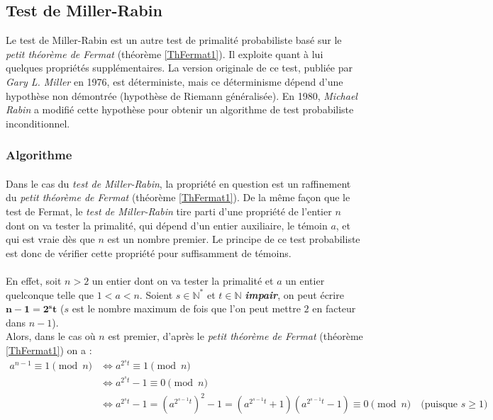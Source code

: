 \subsection{Test de Miller-Rabin}
	Le test de Miller-Rabin est un autre test de primalité probabiliste basé sur le \textit{petit théorème de Fermat} (théorème \ref{ThFermat1}). Il exploite quant à lui quelques propriétés supplémentaires. La version originale de ce test, publiée par \textit{Gary L. Miller} en 1976, est déterministe, mais ce déterminisme dépend d'une hypothèse non démontrée (hypothèse de Riemann généralisée). En 1980, \textit{Michael Rabin} a modifié cette hypothèse pour obtenir un algorithme de test probabiliste inconditionnel.
	
	\subsubsection{Algorithme}
		
		\paragraph{} Dans le cas du \textit{test de Miller-Rabin}, la propriété en question est un raffinement du \textit{petit théorème de Fermat} (théorème \ref{ThFermat1}). De la même façon que le test de Fermat, le \textit{test de Miller-Rabin} tire parti d'une propriété de l'entier $n$ dont on va tester la primalité, qui dépend d'un entier auxiliaire, le témoin $a$, et qui est vraie dès que $n$ est un nombre premier. Le principe de ce test probabiliste est donc de vérifier cette propriété pour suffisamment de témoins.
		
		\paragraph{}En effet, soit $n > 2$ un entier dont on va tester la primalité et $a$ un entier quelconque telle que $1 < a < n$. Soient $s \in \mathbb{N}^{*}$ et $t \in \mathbb{N}$ \textbf{\textit{impair}}, on peut écrire $\mathbf{n - 1 = 2^{s}t}$ ($s$ est le nombre maximum de fois que l'on peut mettre $2$ en facteur dans $n - 1$).\\
		\indent Alors, dans le cas où $n$ est premier, d'après le \textit{petit théorème de Fermat} (théorème \ref{ThFermat1}) on a :
		\begin{align*}
			a^{n-1}\equiv 1 \pmod n &\Leftrightarrow a^{2^{s}t}\equiv 1 \pmod n\\
									&\Leftrightarrow a^{2^{s}t} - 1 \equiv 0 \pmod n\\
									&\Leftrightarrow a^{2^{s}t} - 1 = (a^{2^{s-1}t})^{2} - 1 = (a^{2^{s-1}t} + 1)(a^{2^{s-1}t} - 1) \equiv 0 \pmod n	\quad	\text{(puisque } s \geqslant 1 \text{)}
		\end{align*}
		
